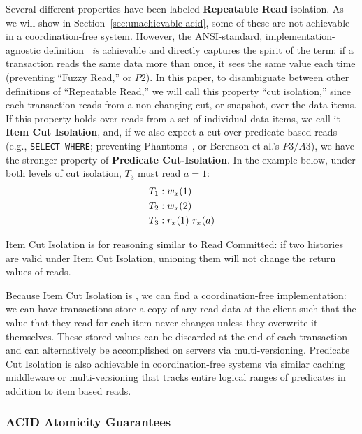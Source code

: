 Several different properties have been labeled \textbf{Repeatable
  Read} isolation. As we will show in
Section~\ref{sec:unachievable-acid}, some of these are not achievable
in a coordination-free system. However, the ANSI-standard,
implementation-agnostic definition~\cite{ansi-sql} \textit{is}
achievable and directly captures the spirit of the term: if a
transaction reads the same data more than once, it sees the same value each
time (preventing ``Fuzzy Read,'' or $P2$). In this paper, to
disambiguate between other definitions of ``Repeatable Read,'' we will
call this property ``cut isolation,'' since each transaction reads
from a non-changing cut, or snapshot, over the data items. If this
property holds over reads from a set of individual data items, we call it
\textbf{Item Cut Isolation}, and, if we also expect a cut over
predicate-based reads (e.g., \texttt{SELECT WHERE}; preventing
Phantoms~\cite{gray-isolation}, or Berenson et al.'s $P3/A3$), we have
the stronger property of \textbf{Predicate Cut-Isolation}. In the
example below, under both levels of cut isolation, $T_3$ must read
$a=1$:
\begin{align*}
\small
T_1 &: w_x(1)
\\T_2 &: w_x(2)
\\T_3 &: r_x(1)~r_x(a)
\end{align*}

Item Cut Isolation is \iconfluent for reasoning similar to Read
Committed: if two histories are valid under Item Cut Isolation,
unioning them will not change the return values of reads.

Because Item Cut Isolation is \iconfluent, we can find a
coordination-free implementation: we can have transactions store a
copy of any read data at the client such that the value that they
read for each item never changes unless they overwrite it
themselves. These stored values can be discarded at the end of each
transaction and can alternatively be accomplished on servers via
multi-versioning. Predicate Cut Isolation is also achievable in
coordination-free systems via similar caching middleware or
multi-versioning that tracks entire logical ranges of predicates in
addition to item based reads.

\subsubsection{ACID Atomicity Guarantees}
\label{sec:ta}

